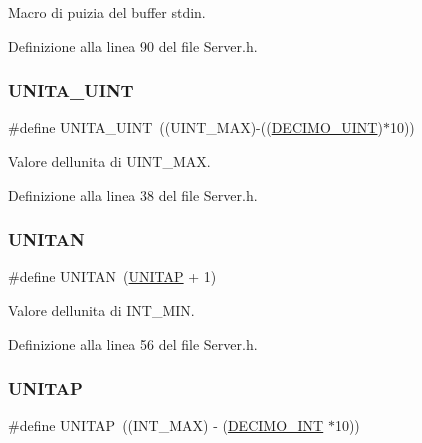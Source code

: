Macro di puizia del buffer stdin. 



Definizione alla linea 90 del file Server.\+h.

\mbox{\label{a00050_a9bc472230cb9c73d7e6481638c4097ff}} 
\subsubsection{\texorpdfstring{UNITA\_UINT}{UNITA\_UINT}}
{\footnotesize\ttfamily \#define U\+N\+I\+T\+A\+\_\+\+U\+I\+NT~((U\+I\+N\+T\+\_\+\+M\+AX)-\/((\mbox{\hyperlink{a00050_af5bf75ca4c78ac29cde0cf581bbbba8c}{D\+E\+C\+I\+M\+O\+\_\+\+U\+I\+NT}})$\ast$10))}



Valore dell\textquotesingle{}unita\textquotesingle{} di U\+I\+N\+T\+\_\+\+M\+AX. 



Definizione alla linea 38 del file Server.\+h.

\mbox{\label{a00050_a2cfda22a0f5fbd983311abc2796ad3f4}} 
\subsubsection{\texorpdfstring{UNITAN}{UNITAN}}
{\footnotesize\ttfamily \#define U\+N\+I\+T\+AN~(\mbox{\hyperlink{a00050_af7ea7ff0e1cdd41a4b679e08a26225ce}{U\+N\+I\+T\+AP}} + 1)}



Valore dell\textquotesingle{}unita\textquotesingle{} di I\+N\+T\+\_\+\+M\+IN. 



Definizione alla linea 56 del file Server.\+h.

\mbox{\label{a00050_af7ea7ff0e1cdd41a4b679e08a26225ce}} 
\subsubsection{\texorpdfstring{UNITAP}{UNITAP}}
{\footnotesize\ttfamily \#define U\+N\+I\+T\+AP~((I\+N\+T\+\_\+\+M\+AX) -\/ (\mbox{\hyperlink{a00050_a3ac31ce35ba8dcc4af19c8045ef22e41}{D\+E\+C\+I\+M\+O\+\_\+\+I\+NT}} $\ast$10))}



